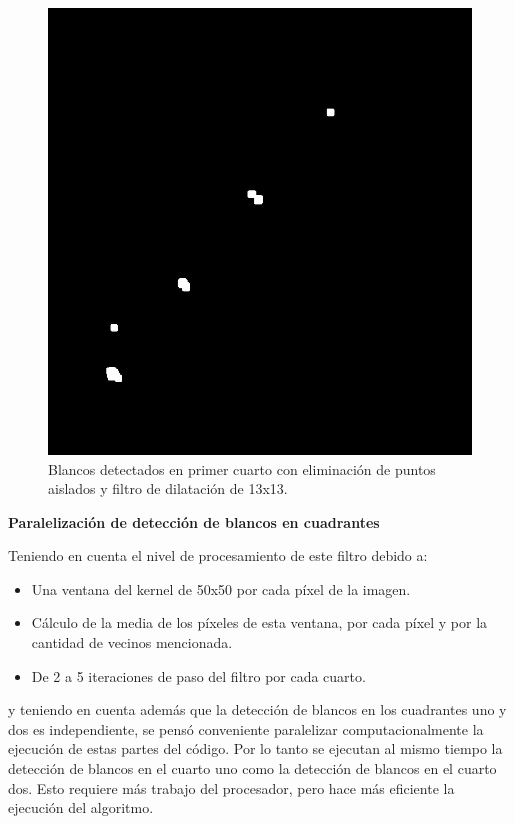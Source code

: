 \documentclass[10pt,a4paper, twoside]{report}
\begin{document}
\begin{figure}[!htb]
\begin {minipage}{0.48\textwidth}
			\includegraphics[width=1.0\linewidth]{imagenes/sndQuarterFourierMask.jpg}
			\caption{Blancos detectados en primer cuarto con eliminación de puntos aislados y filtro de dilatación de 13x13.}
			\label{sndQuarterMask}
   \end{minipage}
\end{figure}



\textbf{Paralelización de detección de blancos en cuadrantes}

Teniendo en cuenta el nivel de procesamiento de este filtro debido a:

\begin{itemize}
	\item Una ventana del kernel de 50x50 por cada píxel de la imagen.
	\item Cálculo de la media de los píxeles de esta ventana, por cada píxel y por la cantidad de vecinos mencionada.
	\item De 2 a 5 iteraciones de paso del filtro por cada cuarto.
\end{itemize}	

y teniendo en cuenta además que la detección de blancos en los cuadrantes uno y dos es independiente, se pensó conveniente paralelizar computacionalmente la ejecución de estas partes del código. Por lo tanto se ejecutan al mismo tiempo la detección de blancos en el cuarto uno como la detección de blancos en el cuarto dos. Esto requiere más trabajo del procesador, pero hace más eficiente la ejecución del algoritmo.
\end{document}
